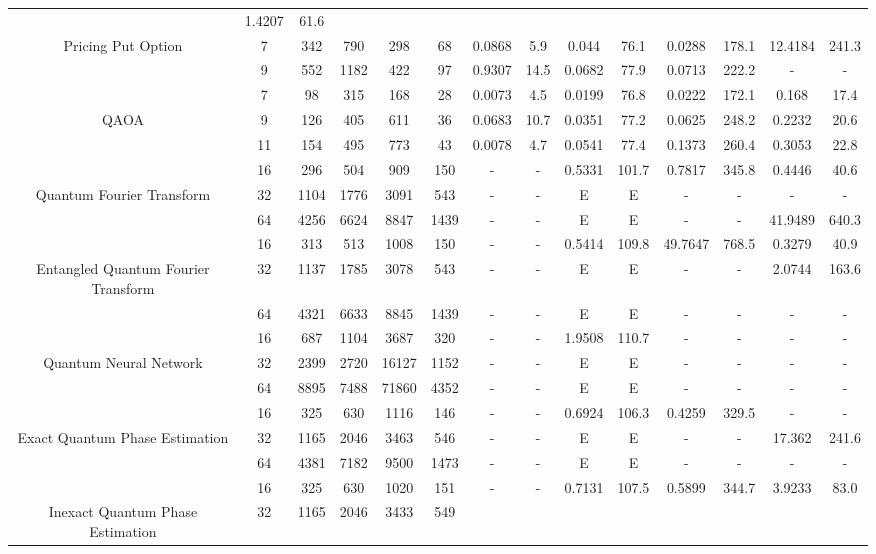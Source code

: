 \begin{table}[htb]
{\begin{tabular}{|c|c|c|c|c|c|c|c|c|c|c|c|c|c|}
 & 1.4207 & 61.6
 \\
Pricing Put Option & 
7 & 342 & 790 & 298 & 68
 & 0.0868 & 5.9
 & 0.044 & 76.1
 & 0.0288 & 178.1
 & 12.4184 & 241.3
 \\
 & 
9 & 552 & 1182 & 422 & 97
 & 0.9307 & 14.5
 & 0.0682 & 77.9
 & 0.0713 & 222.2
 & - & -
 \\
\hline
 & 
7 & 98 & 315 & 168 & 28
 & 0.0073 & 4.5
 & 0.0199 & 76.8
 & 0.0222 & 172.1
 & 0.168 & 17.4
 \\
QAOA & 
9 & 126 & 405 & 611 & 36
 & 0.0683 & 10.7
 & 0.0351 & 77.2
 & 0.0625 & 248.2
 & 0.2232 & 20.6
 \\
 & 
11 & 154 & 495 & 773 & 43
 & 0.0078 & 4.7
 & 0.0541 & 77.4
 & 0.1373 & 260.4
 & 0.3053 & 22.8
 \\
\hline
 & 
16 & 296 & 504 & 909 & 150
 & - & -
 & 0.5331 & 101.7
 & 0.7817 & 345.8
 & 0.4446 & 40.6
 \\
Quantum Fourier Transform & 
32 & 1104 & 1776 & 3091 & 543
 & - & -
 & E & E
 & - & -
 & - & -
 \\
 & 
64 & 4256 & 6624 & 8847 & 1439
 & - & -
 & E & E
 & - & -
 & 41.9489 & 640.3
 \\
\hline
 & 
16 & 313 & 513 & 1008 & 150
 & - & -
 & 0.5414 & 109.8
 & 49.7647 & 768.5
 & 0.3279 & 40.9
 \\
Entangled Quantum Fourier Transform & 
32 & 1137 & 1785 & 3078 & 543
 & - & -
 & E & E
 & - & -
 & 2.0744 & 163.6
 \\
 & 
64 & 4321 & 6633 & 8845 & 1439
 & - & -
 & E & E
 & - & -
 & - & -
 \\
\hline
 & 
16 & 687 & 1104 & 3687 & 320
 & - & -
 & 1.9508 & 110.7
 & - & -
 & - & -
 \\
Quantum Neural Network & 
32 & 2399 & 2720 & 16127 & 1152
 & - & -
 & E & E
 & - & -
 & - & -
 \\
 & 
64 & 8895 & 7488 & 71860 & 4352
 & - & -
 & E & E
 & - & -
 & - & -
 \\
\hline
 & 
16 & 325 & 630 & 1116 & 146
 & - & -
 & 0.6924 & 106.3
 & 0.4259 & 329.5
 & - & -
 \\
Exact Quantum Phase Estimation & 
32 & 1165 & 2046 & 3463 & 546
 & - & -
 & E & E
 & - & -
 & 17.362 & 241.6
 \\
 & 
64 & 4381 & 7182 & 9500 & 1473
 & - & -
 & E & E
 & - & -
 & - & -
 \\
\hline
 & 
16 & 325 & 630 & 1020 & 151
 & - & -
 & 0.7131 & 107.5
 & 0.5899 & 344.7
 & 3.9233 & 83.0
 \\
Inexact Quantum Phase Estimation & 
32 & 1165 & 2046 & 3433 & 549

\end{tabular}}
\end{table}
